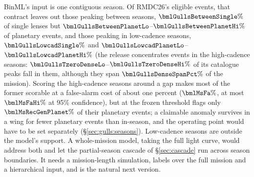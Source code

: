 BinML's input is one contiguous season. Of RMDC26's eligible events, that contract leaves out those
peaking between seasons, $\bmlGullsBetweenSingle\%$ of single lenses but $\bmlGullsBetweenPlanetLo$--$\bmlGullsBetweenPlanetHi\%$
of planetary events, and those peaking in low-cadence seasons, $\bmlGullsLowcadSingle\%$ and
$\bmlGullsLowcadPlanetLo$--$\bmlGullsLowcadPlanetHi\%$ (the release concentrates events in the high-cadence
seasons: $\bmlGullsTzeroDenseLo$--$\bmlGullsTzeroDenseHi\%$ of its catalogue peaks fall in them, although
they span $\bmlGullsDenseSpanPct\%$ of the mission). Scoring the high-cadence seasons around a gap makes
most of the former scorable at a false-alarm cost of about one percent ($\bmlMsFa\%$, at most $\bmlMsFaHi\%$ at 95\% confidence), but at the frozen threshold flags only
$\bmlMsRecGenPlanet\%$ of their planetary events; a claimable anomaly survives in a wing for fewer planetary
events than in-season, and the operating point would have to be set separately (\S\ref{sec:gulls:seasons}).
Low-cadence seasons are outside the model's support. A whole-mission model, taking the full light curve, would address both and let the
partial-season cascade of \S\ref{sec:cascade} run across season boundaries. It needs a mission-length
simulation, labels over the full mission and a hierarchical input, and is the natural next version.


